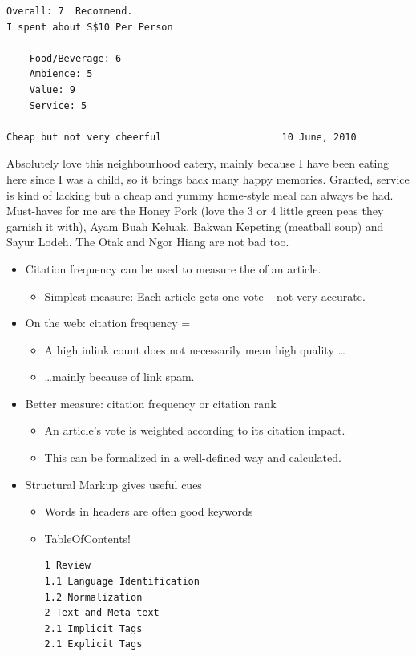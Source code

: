 \documentclass[a4paper,landscape,headrule,footrule,xetex]{foils}
\begin{document}

\begin{verbatim}
Overall: 7  Recommend.
I spent about S$10 Per Person

    Food/Beverage: 6
    Ambience: 5
    Value: 9
    Service: 5

Cheap but not very cheerful                     10 June, 2010 
\end{verbatim}

\begin{small}
  Absolutely love this neighbourhood eatery, mainly because I have
  been eating here since I was a child, so it brings back many happy
  memories. Granted, service is kind of lacking but a cheap and yummy
  home-style meal can always be had. Must-haves for me are the Honey
  Pork (love the 3 or 4 little green peas they garnish it with), Ayam
  Buah Keluak, Bakwan Kepeting (meatball soup) and Sayur Lodeh. The
  Otak and Ngor Hiang are not bad too.
\end{small}



\begin{itemize}
\item Citation frequency can be used to measure
  the  of an article.
\begin{itemize}
\item Simplest measure: Each article gets one vote -- not
  very accurate.
\end{itemize}
\item On the web: citation frequency = 
\begin{itemize}
\item A high inlink count does not necessarily
  mean high quality \ldots
\item \ldots mainly because of link spam.
\end{itemize}
\item Better measure:  citation frequency or citation rank
\begin{itemize}
\item An article's vote is weighted according to its
  citation impact. 
\item This  can be formalized in a   well-defined way and calculated.
\end{itemize}
\end{itemize}


 \begin{itemize}
 \item Structural Markup gives useful cues
   \begin{itemize}
   \item Words in headers are often good keywords
   \item TableOfContents!
\begin{verbatim}
1 Review
1.1 Language Identification
1.2 Normalization
2 Text and Meta-text
2.1 Implicit Tags
2.1 Explicit Tags
\end{verbatim}
   \end{itemize}


 \end{itemize}
\end{document}
